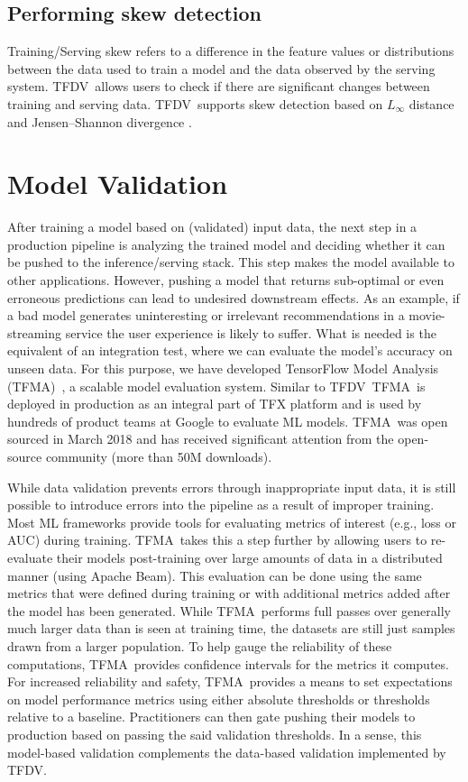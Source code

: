 \documentclass[11pt]{article}
\newcommand{\tfdv}{{\sf TFDV}}
\newcommand{\tfma}{{\sf TFMA}}
\begin{document}
\subsection{Performing skew detection}
Training/Serving skew refers to a difference in the feature values or distributions between the data used to train a model and the data observed by the serving system. \tfdv\ allows users to check if there are significant changes between training and serving data. \tfdv\ supports skew detection based on $L_{\infty}$ distance \cite{tfdvsysml} and Jensen–Shannon divergence \cite{jsd}.


\section{Model Validation}

After training a model based on (validated) input data, the next step in a production pipeline is analyzing the trained model and deciding whether it can be pushed to the inference/serving stack. This step makes the model available to other applications. However, pushing a model that returns sub-optimal or even erroneous predictions can lead to undesired downstream effects. As an example, if a bad model generates uninteresting or irrelevant recommendations in a movie-streaming service the user experience is likely to suffer. What is needed is the equivalent of an integration test, where we can evaluate the model's accuracy on unseen data. For this purpose, we have developed TensorFlow Model Analysis (\tfma)~\cite{tfma}, a scalable model evaluation system. Similar to \tfdv\, \tfma\ is deployed in production as an integral part of TFX platform and is used by hundreds of product teams at Google to evaluate ML models. \tfma\ was open sourced in March 2018 and has received significant attention from the open-source community (more than 50M downloads).

While data validation prevents errors through inappropriate input data, it is still possible to introduce errors into the pipeline as a result of improper training. Most ML frameworks provide tools for evaluating metrics of interest (e.g., loss or AUC) during training. \tfma\ takes this a step further by allowing users to re-evaluate their models post-training over large amounts of data in a distributed manner (using Apache Beam). This evaluation can be done using the same metrics that were defined during training or with additional metrics added after the model has been generated. While \tfma\ performs full passes over generally much larger data than is seen at training time, the datasets are still just samples drawn from a larger population. To help gauge the reliability of these computations, \tfma\ provides confidence intervals for the metrics it computes. For increased reliability and safety, \tfma\ provides a means to set expectations on model performance metrics using either absolute thresholds or thresholds relative to a baseline. Practitioners can then gate pushing their models to production based on passing the said validation thresholds. In a sense, this model-based validation complements the data-based validation implemented by \tfdv.
\end{document}
